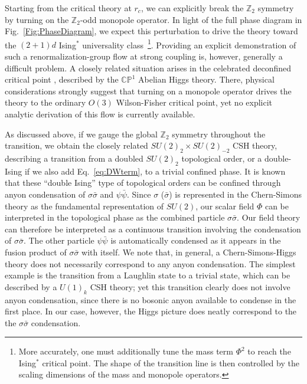 \documentclass[aps, prl, superscriptaddress, twocolumn,
notitlepage, longbibliography,
floatfix]{revtex4-2}
\newcommand{\1}{\text{\uppercase\expandafter{\romannumeral1}}}
\newcommand{\2}{\text{\uppercase\expandafter{\romannumeral2}}}
\newcommand{\3}{\text{\uppercase\expandafter{\romannumeral3}}}
\newcommand{\4}{\text{\uppercase\expandafter{\romannumeral4}}}
\newcommand{\5}{\text{\uppercase\expandafter{\romannumeral5}}}
\newcommand{\6}{\text{\uppercase\expandafter{\romannumeral6}}}
\def\Z{\mathbb{Z}}
\begin{document}
Starting from the critical theory at $r_c$, we can explicitly break the $\mathbb{Z}_2$ symmetry by turning on the $\mathbb{Z}_2$-odd monopole operator. In light of the full phase diagram in Fig.~\ref{Fig:PhaseDiagram}, we expect this perturbation to drive the theory toward the $(2+1)d$ Ising$^*$ universality class~\footnote{More accurately, one must additionally tune the mass term $\Phi^2$ to reach the Ising$^*$ critical point. The shape of the transition line is then controlled by the scaling dimensions of the mass and monopole operators.}. Providing an explicit demonstration of such a renormalization-group flow at strong coupling is, however, generally a difficult problem. A closely related situation arises in the celebrated deconfined critical point \cite{deconfine1,deconfine2}, described by the $\mathbb{CP}^1$ Abelian Higgs theory. There, physical considerations strongly suggest that turning on a monopole operator drives the theory to the ordinary $O(3)$ Wilson-Fisher critical point, yet no explicit analytic derivation of this flow is currently available.


As discussed above, if we gauge the global $\Z_2$ symmetry throughout the transition, we obtain the closely related $SU(2)_2\times SU(2)_{-2}$ CSH theory, describing a transition from a doubled $SU(2)_2$ topological order, or a double-Ising if we also add Eq.~\eqref{eq:DWterm}, to a trivial confined phase. It is known that these ``double Ising'' type of topological orders can be confined through anyon condensation of $\sigma\bar{\sigma}$ and $\psi\bar{\psi}$. Since $\sigma$ ($\bar{\sigma}$) is represented in the Chern-Simons theory as the fundamental representation of $SU(2)$, our scalar field $\Phi$ can be interpreted in the topological phase as the combined particle $\sigma\bar{\sigma}$. Our field theory can therefore be interpreted as a continuous transition involving the condensation of $\sigma\bar{\sigma}$. The other particle $\psi\bar{\psi}$ is automatically condensed as it appears in the fusion product of $\sigma\bar{\sigma}$ with itself. We note that, in general, a Chern-Simons-Higgs theory does not necessarily correspond to any anyon condensation. The simplest example is the transition from a Laughlin state to a trivial state, which can be described by a $U(1)_k$ CSH theory; yet this transition clearly does not involve anyon condensation, since there is no bosonic anyon available to condense in the first place. In our case, however, the Higgs picture does neatly correspond to the the $\sigma\bar{\sigma}$ condensation.
\end{document}
